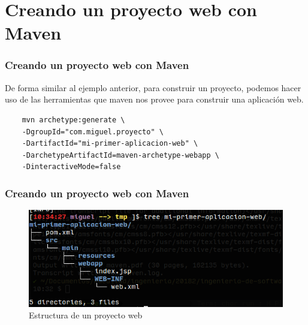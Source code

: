\documentclass{beamer}
\begin{document}
\section{Creando un proyecto web con Maven}

\begin{frame}[fragile]
  \frametitle{Creando un proyecto web con Maven}
  De forma similar al ejemplo anterior, para construir un proyecto, podemos hacer
  uso de las herramientas que maven nos provee para construir una
  aplicación web.

  \begin{verbatim}
    mvn archetype:generate \
    -DgroupId="com.miguel.proyecto" \
    -DartifactId="mi-primer-aplicacion-web" \
    -DarchetypeArtifactId=maven-archetype-webapp \
    -DinteractiveMode=false
  \end{verbatim}
\end{frame}

\begin{frame}[fragile]
  \frametitle{Creando un proyecto web con Maven}
  \begin{figure}[ht]
    \centering
    \includegraphics[scale=0.5]{figures/mvn3.png}
    \caption{\label{fig:maven3} Estructura de un proyecto web}
  \end{figure}

\end{frame}
\end{document}

